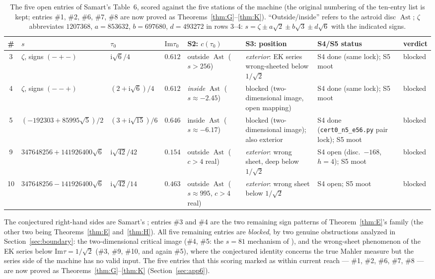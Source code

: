 \documentclass[11pt]{article}
\newcommand{\ii}{\mathrm{i}}
\newcommand{\ImT}{\mathrm{Im}}
\DeclareMathOperator{\Ast}{Ast}
\theoremstyle{definition}
\theoremstyle{remark}
\begin{document}
\begin{table}[htb]
\centering\scriptsize
\caption{The five open entries of Samart's Table~6, scored against the
five stations of the machine (the original numbering of the ten-entry
list is kept; entries \#1, \#2, \#6, \#7, \#8 are now proved as
Theorems~\ref{thm:G}--\ref{thm:K}). ``Outside/inside'' refers to the
astroid disc $\Ast$; $\zeta$ abbreviates
$1207368$, $a=853632$, $b=697680$, $d=493272$ in rows 3--4:
$s=\zeta\pm a\sqrt2\pm b\sqrt3\pm d\sqrt6$ with the indicated signs.}
\label{tab:open}
\setlength{\tabcolsep}{2.5pt}
\begin{tabular}{cp{2.3cm}llp{1.9cm}p{2.3cm}p{2.5cm}l}
\toprule
\# & $s$ & $\tau_0$ & $\ImT\tau_0$ & S2: $c(\tau_0)$ & S3: position
 & S4/S5 status & verdict\\
\midrule
3 & $\zeta$, signs $({-}{+}{-})$ & $\ii\sqrt6/4$ & $0.612$
  & outside $\Ast$ ($s>256$)
  & \emph{exterior}: EK series wrong-sheeted below $1/\sqrt2$
  & S4 done (same lock); S5 moot
  & blocked\\
4 & $\zeta$, signs $({-}{-}{+})$ & $(2+\ii\sqrt6)/4$ & $0.612$
  & \emph{inside} $\Ast$ ($s\approx-2.45$)
  & blocked (two-dimensional image, open mapping)
  & S4 done (same lock); S5 moot
  & blocked\\
5 & $(-192303+85995\sqrt5)/2$ & $(3+\ii\sqrt{15})/6$ & $0.646$
  & inside $\Ast$ ($s\approx-6.17$)
  & blocked (two-dimensional image); also exterior
  & S4 done (\texttt{cert0\_n5\_e56.py} pair lock); S5 moot
  & blocked\\
9 & $347648256+141926400\sqrt6$ & $\ii\sqrt{42}/42$ & $0.154$
  & outside $\Ast$ ($c>4$ real)
  & \emph{exterior}: wrong sheet, deep below $1/\sqrt2$
  & S4 open (disc.\ $-168$, $h=4$); S5 moot
  & blocked\\
10 & $347648256-141926400\sqrt6$ & $\ii\sqrt{42}/14$ & $0.463$
  & outside $\Ast$ ($s\approx995$, $c>4$ real)
  & \emph{exterior}: wrong sheet below $1/\sqrt2$
  & S4 open; S5 moot
  & blocked\\
\bottomrule
\end{tabular}
\end{table}

The conjectured right-hand sides are Samart's \cite[Table~6]{Sa15};
entries \#3 and \#4 are the two remaining sign patterns of
Theorem~\ref{thm:E}'s family (the other two being Theorems~\ref{thm:E}
and~\ref{thm:H}). All five remaining entries are \emph{blocked}, by
two genuine obstructions
analyzed in Section~\ref{sec:boundary}: the two-dimensional critical
image (\#4, \#5: the $s=81$ mechanism of \cite{Zf2}), and the
wrong-sheet phenomenon of the EK series below $\ImT\tau=1/\sqrt2$
(\#3, \#9, \#10, and again \#5), where the conjectured identity
concerns the true Mahler measure but the series side of the machine
has no valid input. The five entries that this scoring marked as
within current reach --- \#1, \#2, \#6, \#7, \#8 --- are now proved
as Theorems~\ref{thm:G}--\ref{thm:K} (Section~\ref{sec:app6}).
\end{document}
